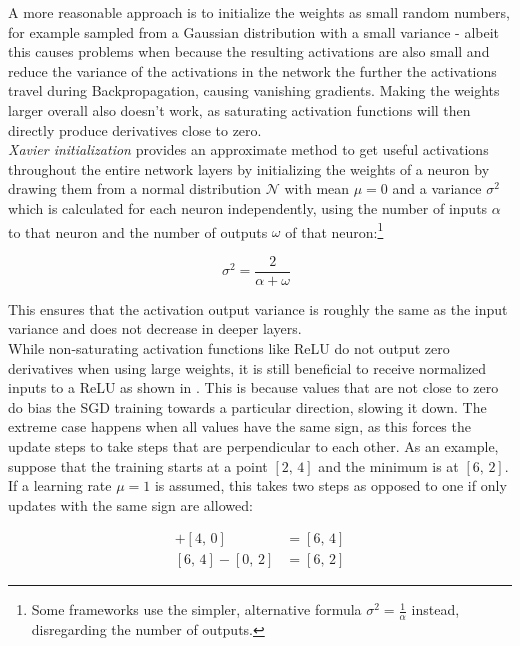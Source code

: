 A more reasonable approach is to initialize the weights as small random numbers, for example sampled from a Gaussian distribution with a small variance - albeit this causes problems when because the resulting activations are also small and reduce the variance of the activations in the network the further the activations travel during Backpropagation, causing vanishing gradients. Making the weights larger overall also doesn't work, as saturating activation functions will then directly produce derivatives close to zero. \cite{karpathy_lecture2}\\

\noindent \textit{Xavier initialization} \cite{glorot} provides an approximate method to get useful activations throughout the entire network layers by initializing the weights of a neuron by drawing them from a normal distribution $\mathcal{N}$ with mean $\mu = 0$ and a variance $\sigma^2$ which is calculated for each neuron independently, using the number of inputs $\alpha$ to that neuron and the number of outputs $\omega$ of that neuron:\footnote{Some frameworks use the simpler, alternative formula $\sigma^2 = \frac{1}{\alpha}$ instead, disregarding the number of outputs.}

\[ \sigma^2 = \frac{2}{\alpha + \omega}\,\,\, \]

\noindent This ensures that the activation output variance is roughly the same as the input variance and does not decrease in deeper layers.\\ %

\noindent While non-saturating activation functions like ReLU do not output zero derivatives when using large weights, it is still beneficial to receive normalized inputs to a ReLU as shown in \cite{lecun_norm}. This is because values that are not close to zero do bias the SGD training towards a particular direction, slowing it down. The extreme case happens when all values have the same sign, as this forces the update steps to take steps that are perpendicular to each other. As an example, suppose that the training starts at a point $[2,\, 4]$ and the minimum is at $[6,\, 2]$. If a learning rate $\mu = 1$ is assumed, this takes two steps as opposed to one if only updates with the same sign are allowed:

\begin {align}
	[2,\, 4] + [4,\, 0] &= [6,\, 4]\\
	[6,\, 4] - [0,\, 2] &= [6,\, 2]
\end {align}

